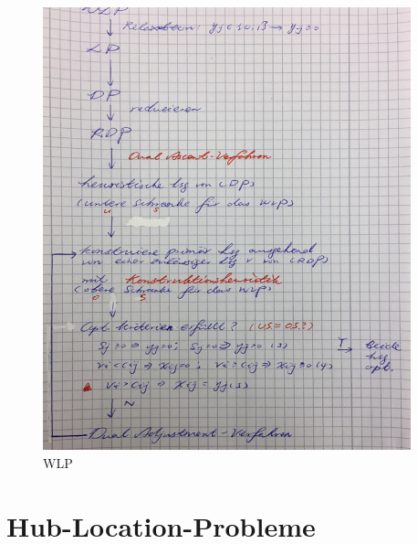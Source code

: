     \begin{note}
      \begin{figure}[H]
        \centering
        \includegraphics[width=0.95\textwidth]{Images/WLP_Zusammenfassung.JPG}
        \caption{WLP}
        \label{fig:WLP}
      \end{figure}
    \end{note}


  \section{Hub-Location-Probleme} %
  \label{sec:hub_location_probleme}
  

    


